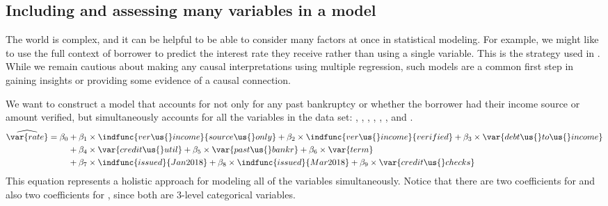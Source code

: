 \subsection{Including and assessing many variables in a model}
\label{includingAndAssessingManyVariablesInAModel}

The world is complex, and it can be helpful to be able to
consider many factors at once in statistical modeling.
For example, we might like to use the full context of
borrower to predict the interest rate they receive
rather than using a single variable.
This is the strategy used in .
While we remain cautious about making any causal
interpretations using multiple regression,
such models are a common first step in gaining insights
or providing some evidence of a causal connection.

We want to construct a model that accounts for not only
for any past bankruptcy or whether the borrower had
their income source or amount verified,
but simultaneously accounts for all the variables
in the data set:
,
,
,
,
,
,
and .
\begin{align*}
\widehat{\var{rate}}
	&= \beta_0 +
	    \beta_1\times \indfunc{ver\us{}income}{source\us{}only} +
	    \beta_2\times \indfunc{ver\us{}income}{verified} +
		\beta_3\times \var{debt\us{}to\us{}income} \\
	&\qquad\  +
	    \beta_4 \times \var{credit\us{}util} +
	    \beta_5 \times \var{past\us{}bankr} +
		\beta_6 \times \var{term} \\
	&\qquad\  +
	    \beta_7 \times \indfunc{issued}{Jan2018} +
	    \beta_8 \times \indfunc{issued}{Mar2018} +
		\beta_9 \times \var{credit\us{}checks}
\end{align*}
This equation represents a holistic approach for modeling
all of the variables simultaneously.
Notice that there are two coefficients for 
and also two coefficients for , since both are
3-level categorical variables.




